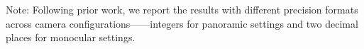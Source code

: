 \documentclass{article}
\theoremstyle{plain}
\theoremstyle{definition}
\theoremstyle{remark}
\begin{document}
\begin{table}[thpb]
{\begin{threeparttable}
\begin{tabular}{@{}c|l|ccccccccccccccc@{}}
			\bottomrule
		\end{tabular}
		\begin{tablenotes}    
			\footnotesize                  
			\item Note: Following prior work, we report the results with different precision formats across camera configurations——integers for panoramic settings and two decimal places for monocular settings. 
		\end{tablenotes}           
		\end{threeparttable} 	
  }\vspace{0mm}
\end{table}
\end{document}
